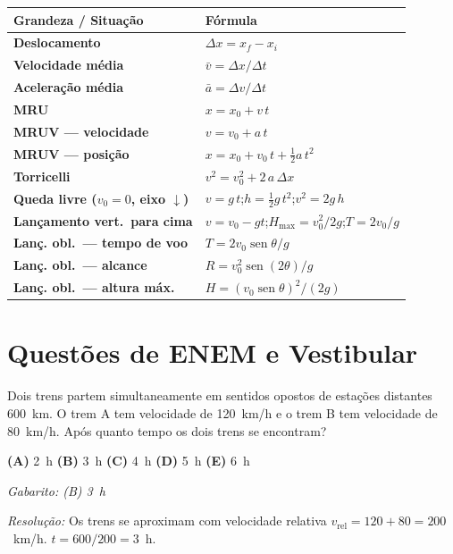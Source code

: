 \documentclass[12pt,a4paper]{article}
\begin{document}
\begin{tcolorbox}[formulabox={Tabela Resumo --- Cinem\'atica}]
  \renewcommand{\arraystretch}{1.7}
  \begin{tabular}{>{\bfseries}ll}
    \toprule
    Grandeza / Situa\c{c}\~ao & F\'ormula \\
    \midrule
    Deslocamento & $\Delta x = x_f - x_i$ \\
    Velocidade m\'edia & $\bar{v} = \Delta x / \Delta t$ \\
    Acelera\c{c}\~ao m\'edia & $\bar{a} = \Delta v / \Delta t$ \\
    \midrule
    MRU & $x = x_0 + v\,t$ \\
    \midrule
    MRUV --- velocidade & $v = v_0 + a\,t$ \\
    MRUV --- posi\c{c}\~ao & $x = x_0 + v_0\,t + \tfrac{1}{2}a\,t^2$ \\
    Torricelli & $v^2 = v_0^2 + 2\,a\,\Delta x$ \\
    \midrule
    Queda livre ($v_0=0$, eixo $\downarrow$) &
      $v = g\,t$;\quad $h = \tfrac{1}{2}g\,t^2$;\quad $v^2 = 2g\,h$ \\
    Lan\c{c}amento vert.\ para cima &
      $v=v_0-gt$;\quad $H_{\max}=v_0^2/2g$;\quad $T=2v_0/g$ \\
    \midrule
    Lan\c{c}. obl.\ --- tempo de voo & $T = 2v_0\operatorname{sen}\theta/g$ \\
    Lan\c{c}. obl.\ --- alcance & $R = v_0^2\operatorname{sen}(2\theta)/g$ \\
    Lan\c{c}. obl.\ --- altura m\'ax. & $H = (v_0\operatorname{sen}\theta)^2/(2g)$ \\
    \bottomrule
  \end{tabular}
\end{tcolorbox}


\section{Quest\~oes de ENEM e Vestibular}

\begin{tcolorbox}[enembox={Quest\~ao 1 --- MRU: Encontro de m\'oveis}]
  Dois trens partem simultaneamente em sentidos opostos de esta\c{c}\~oes
  distantes 600~km. O trem A tem velocidade de 120~km/h e o trem B tem
  velocidade de 80~km/h. Ap\'os quanto tempo os dois trens se encontram?

  \medskip
  \textbf{(A)} 2~h \quad
  \textbf{(B)} 3~h \quad
  \textbf{(C)} 4~h \quad
  \textbf{(D)} 5~h \quad
  \textbf{(E)} 6~h

  \medskip
  \textit{Gabarito: (B) 3~h}

  \textit{Resolu\c{c}\~ao:} Os trens se aproximam com velocidade relativa
  $v_{\text{rel}} = 120 + 80 = 200$~km/h.
  $t = 600 / 200 = 3$~h.
\end{tcolorbox}
\end{document}
